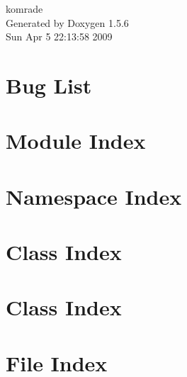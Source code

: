 \documentclass[a4paper]{book}
\begin{document}
\begin{titlepage}
\vspace*{7cm}
\begin{center}
{\Large komrade }\\
\vspace*{1cm}
{\large Generated by Doxygen 1.5.6}\\
\vspace*{0.5cm}
{\small Sun Apr 5 22:13:58 2009}\\
\end{center}
\end{titlepage}
\clearemptydoublepage
{}
\tableofcontents
\clearemptydoublepage
{}
\chapter{Bug List}
\label{bug}

\chapter{Module Index}

\chapter{Namespace Index}

\chapter{Class Index}

\chapter{Class Index}

\chapter{File Index}

\end{document}
